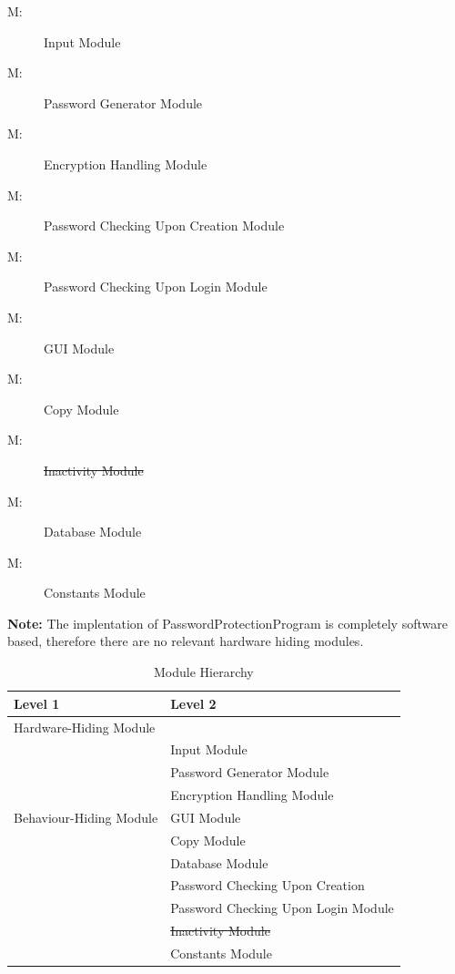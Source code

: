 \documentclass[12pt, titlepage]{article}
\newcounter{mnum}
\newcommand{\mthemnum}{M\themnum}
\begin{document}
\begin{description}
  \item [ \mthemnum \label{mIn}:] Input Module
  \item [ \mthemnum \label{mPG}:] Password Generator Module
  \item [ \mthemnum \label{mEH}:] Encryption Handling Module
  \item [ \mthemnum \label{mPCUC}:] Password Checking Upon Creation Module
  \item [ \mthemnum \label{mPCUL}:] Password Checking Upon Login Module
  \item [ \mthemnum \label{mGUI}:] GUI Module
  \item [ \mthemnum \label{mCop}:] Copy Module
  \item [ \mthemnum \label{mInac}:] \sout{Inactivity Module}
  \item [ \mthemnum \label{mDB}:] Database Module
  \item [ \mthemnum \label{mCons}:] Constants Module

\end{description}

\textbf{Note:} The implentation of PasswordProtectionProgram is completely software based, therefore there are no relevant hardware hiding modules.

\begin{table}[h!]
\centering
\begin{tabular}{p{} p{}}
\toprule
\textbf{Level 1} & \textbf{Level 2}\\
\midrule

{Hardware-Hiding Module} & ~ \\
\midrule

\multirow{7}{0.3\textwidth}{Behaviour-Hiding Module} 
& Input Module\\
& Password Generator Module\\
& Encryption Handling Module\\
& GUI Module\\
& Copy Module\\
& Database Module\\ 
\midrule

\multirow{3}{0.3\textwidth}{Software Decision Module} 
& Password Checking Upon Creation\\
& Password Checking Upon Login Module\\
& \sout{Inactivity Module}\\
& Constants Module\\
\bottomrule

\end{tabular}
\caption{Module Hierarchy}
\label{TblMH}
\end{table}
\end{document}
